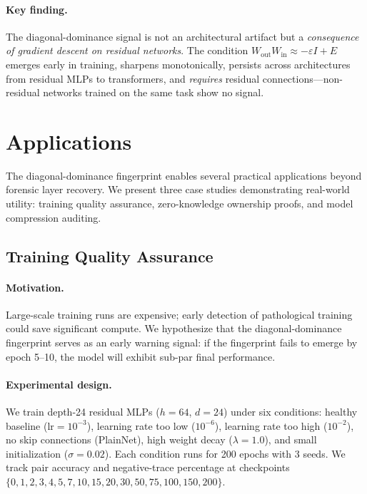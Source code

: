 \documentclass[wcp]{jmlr}
\begin{document}
\paragraph{Key finding.}
The diagonal-dominance signal is not an architectural artifact but a \emph{consequence of gradient descent on residual networks}. The condition $W_{\mathrm{out}}W_{\mathrm{in}} \approx -\varepsilon I + E$ emerges early in training, sharpens monotonically, persists across architectures from residual MLPs to transformers, and \emph{requires} residual connections---non-residual networks trained on the same task show no signal.

\section{Applications}\label{sec:applications}

The diagonal-dominance fingerprint enables several practical applications beyond forensic layer recovery. We present three case studies demonstrating real-world utility: training quality assurance, zero-knowledge ownership proofs, and model compression auditing.

\subsection{Training Quality Assurance}\label{sec:app-qa}

\paragraph{Motivation.} Large-scale training runs are expensive; early detection of pathological training could save significant compute. We hypothesize that the diagonal-dominance fingerprint serves as an early warning signal: if the fingerprint fails to emerge by epoch 5--10, the model will exhibit sub-par final performance.

\paragraph{Experimental design.} We train depth-24 residual MLPs ($h{=}64$, $d{=}24$) under six conditions: healthy baseline ($\text{lr}{=}10^{-3}$), learning rate too low ($10^{-6}$), learning rate too high ($10^{-2}$), no skip connections (PlainNet), high weight decay ($\lambda{=}1.0$), and small initialization ($\sigma{=}0.02$). Each condition runs for 200 epochs with 3 seeds. We track pair accuracy and negative-trace percentage at checkpoints $\{0, 1, 2, 3, 4, 5, 7, 10, 15, 20, 30, 50, 75, 100, 150, 200\}$.
\end{document}
